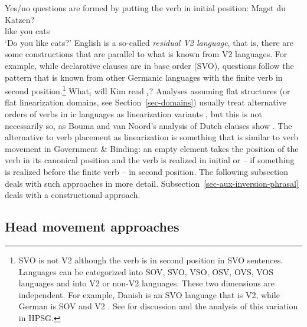 \documentclass[output=paper]{langsci/langscibook}
\begin{document}
Yes/no questions are formed by putting the verb in initial position:
\ea
\gll Magst du Katzen?\\
     like  you cats\\
\glt `Do you like cats?'
\z
English is a so-called \emph{residual V2 language}, that is, there are
some constructions that are parallel to what is known from V2 languages.
For example, while declarative clauses are in base order (SVO), questions follow the pattern that is
known from other Germanic languages with the finite verb in second position.\footnote{%
  SVO is not V2 although the verb is in second position in SVO sentences. Languages can be
  categorized into SOV, SVO, VSO, OSV, OVS, VOS languages and into V2 or non-V2 languages. These two
  dimensions are independent. For example, Danish is an SVO language that is V2, while German is SOV
  and V2 \citep{Haider2019a}. See  for discussion and the analysis of this variation in HPSG.
}
\ea
What$_i$ will Kim read \trace$_i$? 
\z
Analyses assuming flat structures (or flat linearization domains, see Section~\ref{sec-domains})
usually treat alternative orders of verbs in ic languages as linearization variants
\citep{Reape94a,Kathol2001a,Mueller95c,Mueller2003a,TBjerre2006a}, but this is not necessarily so, as
Bouma and van Noord's analysis of Dutch clauses show \citep[, 71]{BvN98a}. The alternative to
verb placement as linearization is something that is similar to verb movement in Government \&
Binding: an empty element takes the position of the verb in its canonical position and the verb is realized
in initial or -- if something is realized before the finite verb -- in second position. The following subsection deals with such approaches in more
detail. Subsection~\ref{sec-aux-inversion-phrasal} deals with a constructional approach.

\subsection{Head movement approaches}
\label{sec-head-movement}
\end{document}
